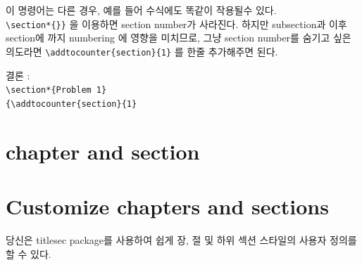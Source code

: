 \documentclass[12pt, a4paper, oneside]{book}
\let\stdsection\section
\renewcommand\section{\newpage\stdsection}
\begin{document}
			이 명령어는 다른 경우, 예를 들어 수식에도 똑같이 작용될수 있다.\\

			\verb|\section*{}}| 을 이용하면 section number가 사라진다.		
			하지만 subsection과 이후 section에 까지 numbering 에 영향을 미치므로, 
			그냥 section number를 숨기고 싶은 의도라면 \verb|\addtocounter{section}{1}| 를 
			한줄 추가해주면 된다.

			결론 :\\
			\verb|\section*{Problem 1}|\\
			\verb|{\addtocounter{section}{1}|


	\newpage
	\section{chapter and section}



	\newpage 
	\section{Customize chapters and sections}


		당신은 titlesec package를 사용하여 
		쉽게 장, 절 및 하위 섹션 스타일의 사용자 정의를 할 수 있다.\\
		
\end{document}
